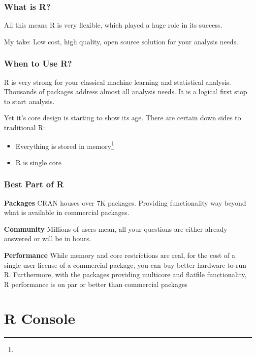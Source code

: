 \documentclass{beamer}\usepackage[]{graphicx}\usepackage[]{color}
\begin{document}
\begin{frame}
\frametitle{What is R?}

All this means R is very flexible, which played a huge role in its success.\vfill

My take: Low cost, high quality, open source solution for your analysis needs.\vfill

\end{frame}

\begin{frame}
\frametitle{When to Use R?}

R is very strong for your classical machine learning and statistical analysis. Thousands of packages address almost all analysis needs. It is a logical first stop to start analysis.\vfill

\pause 
Yet it's core design is starting to show its age. There are certain down sides to traditional R:\vfill

\begin{itemize}
\item Everything is stored in memory\footnote{}
\vspace{1em}

\item R is single core\footnotemark[1]
\end{itemize}
\vfill

\end{frame}


\begin{frame}
\frametitle{Best Part of R}

\textbf{Packages} CRAN houses over 7K packages. Providing functionality way beyond what is available in commercial packages.

\vspace*{1.5em}\textbf{Community} Millions of users mean, all your questions are either already answered or will be in hours.

\vspace*{1.5em}\textbf{Performance} While memory and core restrictions are real, for the cost of a single user license of a commercial package, you can buy better hardware to run R. Furthermore, with the packages providing multicore and flatfile functionality, R performance is on par or better than commercial packages

\end{frame}


\section{R Console}
\end{document}
